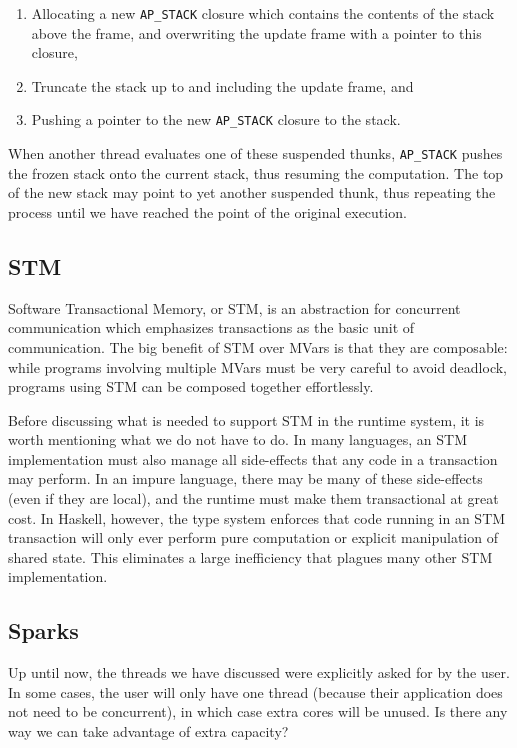 \begin{enumerate}
    \item Allocating a new \verb|AP_STACK| closure which contains the
        contents of the stack above the frame, and overwriting the
        update frame with a pointer to this closure,
    \item Truncate the stack up to and including the update frame, and
    \item Pushing a pointer to the new \verb|AP_STACK| closure to the stack.
\end{enumerate}

When another thread evaluates one of these suspended thunks,
\verb|AP_STACK| pushes the frozen stack onto the current stack, thus
resuming the computation.  The top of the new stack may point to
yet another suspended thunk, thus repeating the process until we
have reached the point of the original execution.

\subsection{STM}

Software Transactional Memory, or STM, is an abstraction for concurrent
communication which emphasizes transactions as the basic unit of
communication.  The big benefit of STM over MVars is that they are
composable: while programs involving multiple MVars must be very careful
to avoid deadlock, programs using STM can be composed together
effortlessly.

Before discussing what is needed to support STM in the runtime system,
it is worth mentioning what we do not have to do.  In many languages,
an STM implementation must also manage all side-effects that any code
in a transaction may perform.  In an impure language, there may be many
of these side-effects (even if they are local), and the runtime must
make them transactional at great cost.  In Haskell, however, the type system
enforces that code running in an STM transaction will only ever perform
pure computation or explicit manipulation of shared state.  This eliminates
a large inefficiency that plagues many other STM implementation.


\subsection{Sparks}

Up until now, the threads we have discussed were explicitly asked for
by the user.  In some cases, the user will only have one thread (because
their application does not need to be concurrent), in which case extra
cores will be unused.  Is there any way we can take advantage of extra
capacity?

